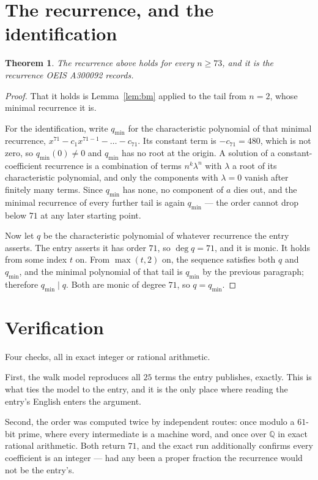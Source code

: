 \documentclass[11pt,a4paper]{article}
\theoremstyle{plain}
\newtheorem{theorem}{Theorem}
\theoremstyle{definition}
\begin{document}
\section{The recurrence, and the identification}

\begin{theorem}
The recurrence above holds for every $n\ge73$, and it is the recurrence OEIS A300092 records.
\end{theorem}

\begin{proof}
That it holds is Lemma~\ref{lem:bm} applied to the tail from $n=2$, whose minimal
recurrence it is.

For the identification, write $q_{\min}$ for the characteristic polynomial of that minimal
recurrence, $x^{71}-c_1x^{71-1}-\dots-c_{71}$. Its constant term is
$-c_{71}=480$, which is not zero, so $q_{\min}(0)\neq0$ and $q_{\min}$ has no
root at the origin. A solution of a constant-coefficient recurrence is a combination of terms
$n^{k}\lambda^{n}$ with $\lambda$ a root of its characteristic polynomial, and only the
components with $\lambda=0$ vanish after finitely many terms. Since $q_{\min}$ has none, no
component of $a$ dies out, and the minimal recurrence of every further tail is again
$q_{\min}$ --- the order cannot drop below $71$ at any later starting point.

Now let $q$ be the characteristic polynomial of whatever recurrence the entry asserts. The
entry asserts it has order $71$, so $\deg q=71$, and it is monic. It holds from some
index $t$ on. From $\max(t,2)$ on, the sequence satisfies both $q$ and $q_{\min}$, and
the minimal polynomial of that tail is $q_{\min}$ by the previous paragraph; therefore
$q_{\min}\mid q$. Both are monic of degree $71$, so $q=q_{\min}$.
\end{proof}

\section{Verification}

Four checks, all in exact integer or rational arithmetic.

First, the walk model reproduces all $25$ terms the entry publishes, exactly. This is
what ties the model to the entry, and it is the only place where reading the entry's English
enters the argument.

Second, the order was computed twice by independent routes: once modulo a $61$-bit prime, where
every intermediate is a machine word, and once over $\mathbb{Q}$ in exact rational arithmetic.
Both return $71$, and the exact run additionally confirms every coefficient is an integer
--- had any been a proper fraction the recurrence would not be the entry's.
\end{document}
